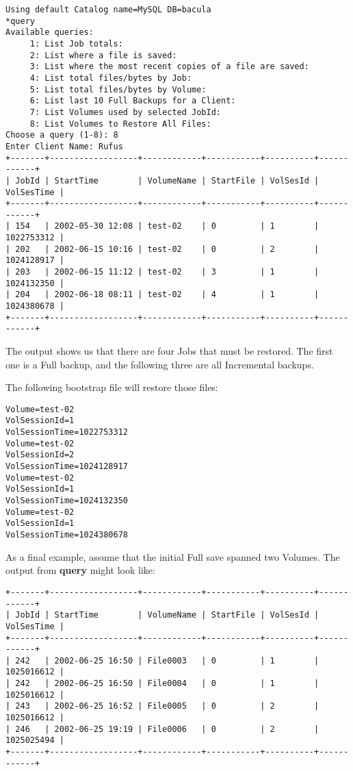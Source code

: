 \footnotesize
\begin{verbatim}
Using default Catalog name=MySQL DB=bacula
*query
Available queries:
     1: List Job totals:
     2: List where a file is saved:
     3: List where the most recent copies of a file are saved:
     4: List total files/bytes by Job:
     5: List total files/bytes by Volume:
     6: List last 10 Full Backups for a Client:
     7: List Volumes used by selected JobId:
     8: List Volumes to Restore All Files:
Choose a query (1-8): 8
Enter Client Name: Rufus
+-------+------------------+------------+-----------+----------+------------+
| JobId | StartTime        | VolumeName | StartFile | VolSesId | VolSesTime |
+-------+------------------+------------+-----------+----------+------------+
| 154   | 2002-05-30 12:08 | test-02    | 0         | 1        | 1022753312 |
| 202   | 2002-06-15 10:16 | test-02    | 0         | 2        | 1024128917 |
| 203   | 2002-06-15 11:12 | test-02    | 3         | 1        | 1024132350 |
| 204   | 2002-06-18 08:11 | test-02    | 4         | 1        | 1024380678 |
+-------+------------------+------------+-----------+----------+------------+
\end{verbatim}
\normalsize

The output shows us that there are four Jobs that must be restored. The first
one is a Full backup, and the following three are all Incremental backups. 

The following bootstrap file will restore those files: 

\footnotesize
\begin{verbatim}
Volume=test-02
VolSessionId=1
VolSessionTime=1022753312
Volume=test-02
VolSessionId=2
VolSessionTime=1024128917
Volume=test-02
VolSessionId=1
VolSessionTime=1024132350
Volume=test-02
VolSessionId=1
VolSessionTime=1024380678
\end{verbatim}
\normalsize

As a final example, assume that the initial Full save spanned two Volumes. The
output from {\bf query} might look like: 

\footnotesize
\begin{verbatim}
+-------+------------------+------------+-----------+----------+------------+
| JobId | StartTime        | VolumeName | StartFile | VolSesId | VolSesTime |
+-------+------------------+------------+-----------+----------+------------+
| 242   | 2002-06-25 16:50 | File0003   | 0         | 1        | 1025016612 |
| 242   | 2002-06-25 16:50 | File0004   | 0         | 1        | 1025016612 |
| 243   | 2002-06-25 16:52 | File0005   | 0         | 2        | 1025016612 |
| 246   | 2002-06-25 19:19 | File0006   | 0         | 2        | 1025025494 |
+-------+------------------+------------+-----------+----------+------------+
\end{verbatim}
\normalsize

